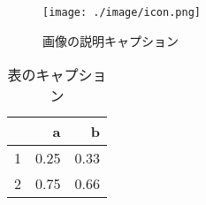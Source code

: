 \begin{figure}[htbp]
    \centering
    \texttt{[image: ./image/icon.png]}
    \caption{画像の説明キャプション}
    \label{fig1}
\end{figure}

\begin{table}[h]
    \centering
    \begin{tabular}{r|rr}
    & a & b\\ \hline
    1& 0.25 & 0.33\\
    2& 0.75 & 0.66\\
    \end{tabular}
    \caption{表のキャプション}
    \label{table1}
\end{table}